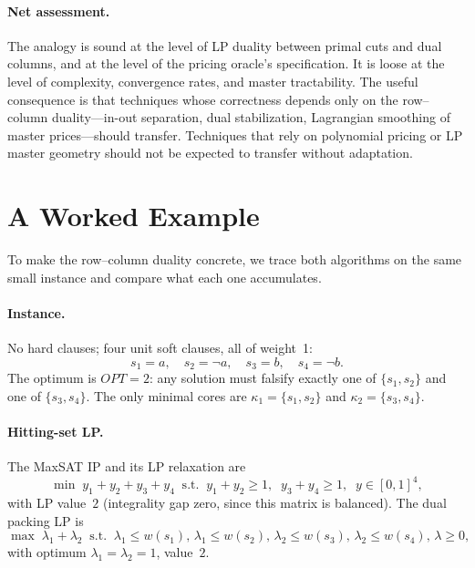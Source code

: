 \documentclass[11pt,a4paper]{article}
\begin{document}
\paragraph{Net assessment.} The analogy is sound at the level of LP duality
between primal cuts and dual columns, and at the level of the pricing oracle's
specification. It is loose at the level of complexity, convergence rates, and
master tractability. The useful consequence is that techniques whose
correctness depends only on the row--column duality---in-out separation,
dual stabilization, Lagrangian smoothing of master prices---should transfer.
Techniques that rely on polynomial pricing or LP master geometry should not
be expected to transfer without adaptation.

\section{A Worked Example}
\label{sec:example}

To make the row--column duality concrete, we trace both algorithms on the
same small instance and compare what each one accumulates.

\paragraph{Instance.} No hard clauses; four unit soft clauses, all of
weight~1:
\[
  s_1 = a,\quad s_2 = \neg a,\quad s_3 = b,\quad s_4 = \neg b.
\]
The optimum is $\mathit{OPT} = 2$: any solution must falsify exactly one of
$\{s_1, s_2\}$ and one of $\{s_3, s_4\}$. The only minimal cores are
$\kappa_1 = \{s_1, s_2\}$ and $\kappa_2 = \{s_3, s_4\}$.

\paragraph{Hitting-set LP.} The MaxSAT IP and its LP relaxation are
\[
  \min\; y_1+y_2+y_3+y_4
  \;\;\text{s.t.}\;\; y_1+y_2 \geq 1,\;\; y_3+y_4 \geq 1,\;\; y \in [0,1]^4,
\]
with LP value~$2$ (integrality gap zero, since this matrix is balanced). The
dual packing LP is
\[
  \max\; \lambda_1 + \lambda_2
  \;\;\text{s.t.}\;\; \lambda_1 \leq w(s_1),\, \lambda_1 \leq w(s_2),\,
  \lambda_2 \leq w(s_3),\, \lambda_2 \leq w(s_4),\, \lambda \geq 0,
\]
with optimum $\lambda_1 = \lambda_2 = 1$, value~$2$.
\end{document}
